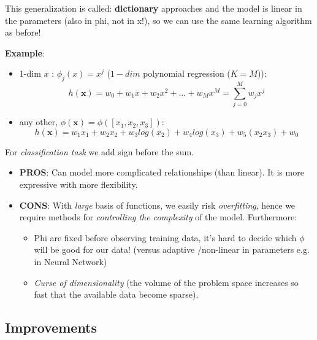 \documentclass[../main.tex]{subfiles}
\begin{document}
This generalization is called: \textbf{dictionary} approaches and the model is linear in the parameters (also in phi, not in x!), so we can use the same learning algorithm as before!

\textbf{Example}:
\begin{itemize}
    \item 1-dim $x$ : $\phi_j(x) = x^j$ ($1-dim$ polynomial regression ($K=M$)):
    $$ h(\mathbf{x}) = w_0 + w_1x + w_2x^2 + \dots + w_Mx^M = \sum_{j = 0}^M w_jx^j$$
    
    \item any other, $\phi(\mathbf{x}) = \phi([x_1, x_2, x_3])$:
    $$  h(\mathbf{x}) = w_1x_1 + w_2x_2 + w_3 log(x_2)+ w_4 log(x_3) + w_5(x_2x_3) + w_0 $$
\end{itemize}

For \emph{classification task} we add sign before the sum.
\begin{itemize}
    \item \textbf{PROS}: Can model more complicated relationships (than linear). It is more expressive with more flexibility.
    \item \textbf{CONS}: With \emph{large} basis of functions, we easily risk \emph{overfitting}, hence we require methods for \emph{controlling the complexity} of the model. Furthermore:
    \begin{itemize}
        \item Phi are fixed before observing training data, it's hard to decide which $\phi$ will be good for our data! (versus adaptive /non-linear in parameters e.g. in Neural Network)
        \item \textit{Curse of dimensionality} (the volume of the problem space increases so fast that the available data become sparse).
    \end{itemize}
\end{itemize}

\subsection{Improvements}
\end{document}

